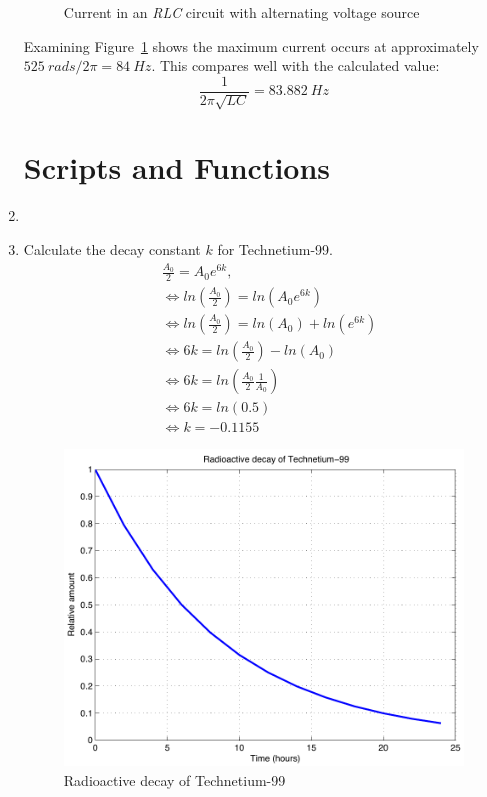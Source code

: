 \begin{enumerate}
\begin{figure}[h]
	\caption{Current in an \textit{RLC} circuit with alternating voltage source}
	\label{fig:3D-RLC-plot-rotate}
\end{figure}
Examining Figure~\ref{fig:3D-RLC-plot-rotate} shows the maximum current occurs at approximately $525~rads/2\pi=84~Hz$. This compares well with the calculated value:
\begin{equation*}
\frac{1}{2\pi\sqrt{LC}} = 83.882~Hz
\end{equation*}

\clearpage
\section*{Scripts and Functions}
\item 

\newpage
\item Calculate the decay constant $k$ for Technetium-99.
\begin{align*}
& \frac{A_0}{2} = A_0 e^{6k}, \\
& \Leftrightarrow ln \left( \frac{A_0}{2} \right) = ln \left( A_0 e^{6k} \right) \\
& \Leftrightarrow ln \left( \frac{A_0}{2} \right) = ln (A_0) + ln \left( e^{6k} \right) \\
& \Leftrightarrow 6k = ln \left( \frac{A_0}{2} \right) - ln(A_0) \\
& \Leftrightarrow 6k = ln \left( \frac{A_0}{2} \frac{1}{A_0}\right)  \\
& \Leftrightarrow 6k = ln (0.5)  \\
& \Leftrightarrow k = -0.1155
\end{align*}

\begin{figure}[h]
	\myfloatalign
	\includegraphics[width=\linewidth]{Graphics/Additional-Ex/decay-plot}
	\caption{Radioactive decay of Technetium-99}
	\label{fig:decay-plot}
\end{figure}


\end{enumerate}
